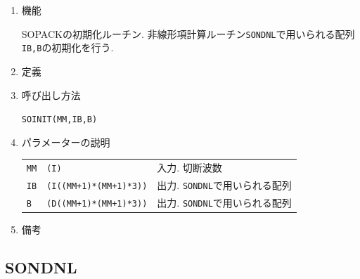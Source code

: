 \documentclass[a4j,fleqn]{jarticle}
\begin{document}
\begin{enumerate}

\item 機能 

SOPACKの初期化ルーチン. 
非線形項計算ルーチン{\tt SONDNL}で用いられる配列
{\tt IB,B}の初期化を行う.

\item 定義

\item 呼び出し方法 
    
{\tt SOINIT(MM,IB,B)}
  
\item パラメーターの説明 
    
\begin{tabular}{lll}
{\tt MM} & {\tt (I)} & 入力. 切断波数\\
{\tt IB}  & {\tt (I((MM+1)*(MM+1)*3))} & 出力. {\tt SONDNL}で用いられる配列\\
{\tt B}  & {\tt (D((MM+1)*(MM+1)*3))} & 出力. {\tt SONDNL}で用いられる配列
\end{tabular}

\item 備考

\end{enumerate}


\subsection{SONDNL}
\end{document}
